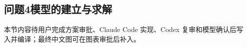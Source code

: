 \subsection{问题4模型的建立与求解}\label{sub:5.4}

本节内容待用户完成方案审批、Claude Code 实现、Codex 复审和模型确认后写入并编译；最终中文图可在图表审批后补入。
